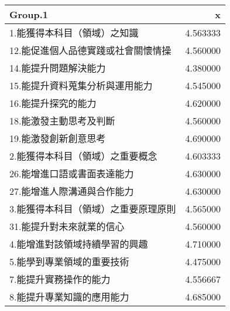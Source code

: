 \documentclass[
]{book}
\newenvironment{Shaded}{\begin{snugshade}}{\end{snugshade}}
\newcommand{\AttributeTok}[1]{\textcolor[rgb]{0.77,0.63,0.00}{#1}}
\newcommand{\DecValTok}[1]{\textcolor[rgb]{0.00,0.00,0.81}{#1}}
\newcommand{\FunctionTok}[1]{\textcolor[rgb]{0.00,0.00,0.00}{#1}}
\newcommand{\NormalTok}[1]{#1}
\newcommand{\OtherTok}[1]{\textcolor[rgb]{0.56,0.35,0.01}{#1}}
\newcommand{\SpecialCharTok}[1]{\textcolor[rgb]{0.00,0.00,0.00}{#1}}
\newcommand{\StringTok}[1]{\textcolor[rgb]{0.31,0.60,0.02}{#1}}
\begin{document}
\begin{Shaded}
\end{Shaded}

\begin{tabular}{l|r}
\hline
Group.1 & x\\
\hline
1.能獲得本科目（領域）之知識 & 4.563333\\
\hline
12.能促進個人品德實踐或社會關懷情操 & 4.560000\\
\hline
14.能提升問題解決能力 & 4.380000\\
\hline
15.能提升資料蒐集分析與運用能力 & 4.545000\\
\hline
16.能提升探究的能力 & 4.620000\\
\hline
18.能激發主動思考及判斷 & 4.560000\\
\hline
19.能激發創新創意思考 & 4.690000\\
\hline
2.能獲得本科目（領域）之重要概念 & 4.603333\\
\hline
26.能增進口語或書面表達能力 & 4.630000\\
\hline
27.能增進人際溝通與合作能力 & 4.630000\\
\hline
3.能獲得本科目（領域）之重要原理原則 & 4.565000\\
\hline
31.能提升對未來就業的信心 & 4.560000\\
\hline
4.能增進對該領域持續學習的興趣 & 4.710000\\
\hline
5.能學到專業領域的重要技術 & 4.475000\\
\hline
7.能提升實務操作的能力 & 4.556667\\
\hline
8.能提升專業知識的應用能力 & 4.685000\\
\hline
\end{tabular}
\end{document}
